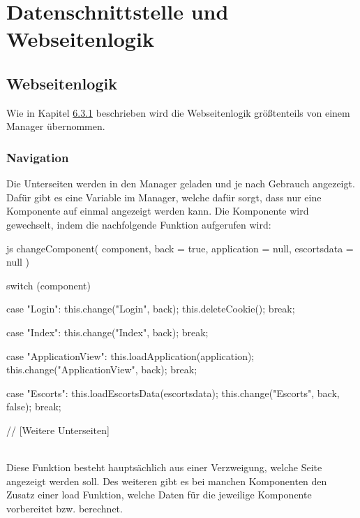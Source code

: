 \section{Datenschnittstelle und Webseitenlogik}
\subsection{Webseitenlogik}
Wie in Kapitel \hyperref[sec:webseitenlogik]{6.3.1} beschrieben wird die Webseitenlogik größtenteils von einem Manager übernommen.

\subsubsection{Navigation}
Die Unterseiten werden in den Manager geladen und je nach Gebrauch angezeigt. Dafür gibt es eine Variable im Manager, welche dafür sorgt, dass nur eine Komponente auf einmal angezeigt werden kann. Die Komponente wird gewechselt, indem die nachfolgende Funktion aufgerufen wird:
\begin{code}{js}
	changeComponent(
	component,
	back = true,
	application = null,
	escortsdata = null
	) {
		switch (component) {
			case "Login":
			this.change("Login", back);
			this.deleteCookie();
			break;
			
			case "Index":
			this.change("Index", back);
			break;
			
			case "ApplicationView":
			this.loadApplication(application);
			this.change("ApplicationView", back);
			break;
			
			case "Escorts":
			this.loadEscortsData(escortsdata);
			this.change("Escorts", back, false);
			break;
			
			// [Weitere Unterseiten]
		}
	}
\end{code}
~\\
\newpage
Diese Funktion besteht hauptsächlich aus einer Verzweigung, welche Seite angezeigt werden soll.
Des weiteren gibt es bei manchen Komponenten den Zusatz einer load Funktion, welche Daten für die jeweilige Komponente vorbereitet bzw. berechnet.

